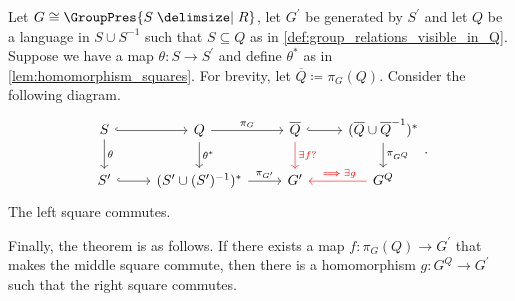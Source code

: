 \begin{theorem}
	Let $G \cong \GroupPres{S \relations R}$, let  $G^\prime$ be generated by $S^\prime$ and let $Q$ be a language in  $S \cup S^{-1}$ such that $S \subseteq Q$ as in \cref{def:group_relations_visible_in_Q}.
	Suppose we have a map $\theta \colon S \to S^\prime$ and define $\theta^*$ as in \cref{lem:homomorphism_squares}.
	For brevity, let $\overline{Q} \coloneqq \pi_G(Q)$.
	Consider the following diagram.
	\[
		\begin{tikzcd}
			S \ar[d, "\theta"] \ar[r, hook] & Q \ar[d, "\theta^*"] \ar[r, "\pi_G"] & \overline{Q} \ar[d, color=red, "\exists f ?"] \ar[r, hook] & (\overline{Q} \cup \overline{Q}^{-1})^* \ar[d, "\pi_{G^Q}"]\\
			S^\prime \ar[r, hook] & (S^\prime \cup (S^\prime)^{-1})^* \ar[r, "\pi_{G^\prime}"] & G^\prime & G^Q \ar[l, color=red, "\implies \exists g"']
		\end{tikzcd}
		.\]
	The left square commutes.

	Finally, the theorem is as follows.
	If there exists a map $f \colon \pi_G(Q) \to G^\prime$ that makes the middle square commute, then there is a homomorphism $g \colon G^Q \to G^\prime$ such that the right square commutes.
	\label{thm:commuting_diagram_GQ}
\end{theorem}
